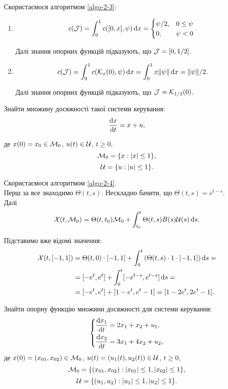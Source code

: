 \begin{solution}
	Скористаємося алгоритмом \ref{algo-2-3}:
	\begin{enumerate}
		\item \[c(\mathcal{J}) = \int_0^1 c([0, x], \psi) \mathop{}\!\mathrm{d} x = \begin{cases} \psi / 2, & 0 \le \psi \\ 0, & \psi < 0 \end{cases}. \]

		Далі знання опорних функцій підказують, що $\mathcal{J} = [0, 1 / 2]$.

		\item \[c(\mathcal{J}) = \int_0^1 c(\mathcal{K}_x(0), \psi) \mathop{}\!\mathrm{d} x = \int_0^1 x \| \psi \| \mathop{}\!\mathrm{d} x = \| \psi \| / 2. \]

		Далі знання опорних функцій підказують, що $\mathcal{J} = \mathcal{K}_{1 / 2} (0)$.
	\end{enumerate}
\end{solution}

\begin{problem}
	Знайти множину досяжності такої системи керування: \[ \frac{\mathop{}\!\mathrm{d} x}{\mathop{}\!\mathrm{d} t} = x + u, \]

	де $x (0) = x_0 \in \mathcal{M}_0$, $u (t) \in \mathcal{U}$, $t \ge 0$, \[ \mathcal{M}_0 = \{ x: |x| \le 1 \}, \] \[ \mathcal{U} = \{ u: |u| \le 1 \}. \]
\end{problem}

\begin{solution}
	Скористаємося алгоритмом \ref{algo-2-4}. \\

	Перш за все знаходимо $\Theta(t,s)$. Нескладно бачити, що $\Theta(t, s) = e^{t - s}$. \\

	Далі \[ \mathcal{X}(t, \mathcal{M}_0) = \Theta(t, t_0) \mathcal{M}_0 + \int_{t_0}^t \Theta(t, s) B(s) \mathcal{U}(s) \mathop{}\!\mathrm{d} s. \]

	Підставимо вже відомі значення: 
	\begin{align*} 
		\mathcal{X}(t, [-1, 1]) &= \Theta(t, 0) \cdot [-1, 1] + \int_0^t \left( \Theta(t, s) \cdot 1 \cdot [-1, 1] \right) \mathop{}\!\mathrm{d} s = \\
		&= [-e^t, e^t] + \int_0^t [-e^{t - s}, e^{t - s}] \mathop{}\!\mathrm{d} s = \\ 
		&= [-e^t, e^t] + [1 - e^t, e^t - 1] = [1 - 2 e^t, 2 e^t - 1]. 
	\end{align*}
\end{solution}

\begin{problem}
	Знайти опорну функцію множини досяжності для системи керування: \[
	\left\{
		\begin{aligned}
			\frac{\mathop{}\!\mathrm{d} x_1}{\mathop{}\!\mathrm{d} t} &= 2x_1 + x_2 + u_1, \\
			\frac{\mathop{}\!\mathrm{d} x_2}{\mathop{}\!\mathrm{d} t} &= 3x_1 + 4x_2 + u_2,
		\end{aligned}
	\right.
	\]
	де $x (0) = (x_{01}, x_{02}) \in \mathcal{M}_0$, $u(t) = (u_1(t), u_2(t)) \in \mathcal{U}$, $t \ge 0$, \[ \mathcal{M}_0 = \{ (x_{01}, x_{02}): |x_{01}| \le 1, |x_{02}| \le 1 \}, \] \[ \mathcal{U} = \{(u_1, u_2): |u_1| \le 1, |u_2| \le 1\}. \]
\end{problem}

